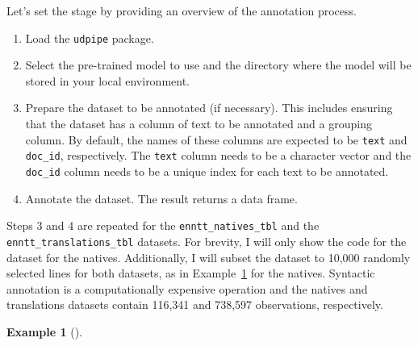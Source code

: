 \documentclass[
  letterpaper,
]{latex/krantz}
\providecommand{\tightlist}{%
  \setlength{\itemsep}{0pt}\setlength{\parskip}{0pt}}\usepackage{longtable,booktabs,array}
\theoremstyle{definition}
\newtheorem{example}{Example}[chapter]
\theoremstyle{remark}
\begin{document}
Let's set the stage by providing an overview of the annotation process.

\begin{enumerate}
\def\labelenumi{\arabic{enumi}.}
\tightlist
\item
  Load the \texttt{udpipe} package.
\item
  Select the pre-trained model to use and the directory where the model
  will be stored in your local environment.
\item
  Prepare the dataset to be annotated (if necessary). This includes
  ensuring that the dataset has a column of text to be annotated and a
  grouping column. By default, the names of these columns are expected
  to be \texttt{text} and \texttt{doc\_id}, respectively. The
  \texttt{text} column needs to be a character vector and the
  \texttt{doc\_id} column needs to be a unique index for each text to be
  annotated.
\item
  Annotate the dataset. The result returns a data frame.
\end{enumerate}

Steps 3 and 4 are repeated for the \texttt{enntt\_natives\_tbl} and the
\texttt{enntt\_translations\_tbl} datasets. For brevity, I will only
show the code for the dataset for the natives. Additionally, I will
subset the dataset to 10,000 randomly selected lines for both datasets,
as in Example~\ref{exm-td-generation-subset-natives} for the natives.
Syntactic annotation is a computationally expensive operation and the
natives and translations datasets contain 116,341 and 738,597
observations, respectively.

\begin{example}[]\protect\hypertarget{exm-td-generation-subset-natives}{}\label{exm-td-generation-subset-natives}

~

\end{example}
\end{document}
